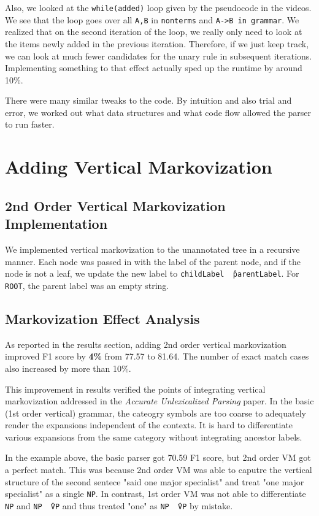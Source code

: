 \documentclass[12pt]{article}
\begin{document}
Also, we looked at the \texttt{while(added)} loop given by the pseudocode in the videos. We see that the loop goes over all \texttt{A,B} in \texttt{nonterms} and \texttt{A->B in grammar}. We realized that on the second iteration of the loop, we really only need to look at the items newly added in the previous iteration. Therefore, if we just keep track, we can look at much fewer candidates for the unary rule in subsequent iterations. Implementing something to that effect actually sped up the runtime by around 10\%.

There were many similar tweaks to the code. By intuition and also trial and error, we worked out what data structures and what code flow allowed the parser to run faster.
\section{Adding Vertical Markovization}
\subsection{2nd Order Vertical Markovization Implementation}
We implemented vertical markovization to the unannotated tree in a recursive manner. Each node was passed in with the label of the parent node, and if the node is not a leaf, we update the new label to \texttt{childLabel \^\ parentLabel}. For \texttt{ROOT}, the parent label was an empty string.
\subsection{Markovization Effect Analysis}
As reported in the results section, adding 2nd order vertical markovization improved F1 score by \textbf{4\%} from 77.57 to 81.64. The number of exact match cases also increased by more than 10\%.

This improvement in results verified the points of integrating vertical markovization addressed in the \textit{Accurate Unlexicalized Parsing} paper. In the basic (1st order vertical) grammar, the cateogry symbols are too coarse to adequately render the expansions independent of the contexts. It is hard to differentiate various expansions from the same category without integrating ancestor labels.


In the example above, the basic parser got 70.59 F1 score, but 2nd order VM got a perfect match. This was because 2nd order VM was able to caputre the vertical structure of the second sentece "said one major specialist" and treat "one major specialist" as a single \texttt{NP}. In contrast, 1st order VM was not able to differentiate \texttt{NP} and \texttt{NP \^\ VP} and thus treated "one" as \texttt{NP \^\ VP} by mistake.
\end{document}
